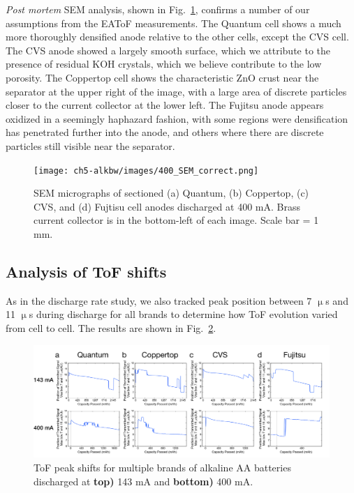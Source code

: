 \textit{Post mortem} SEM analysis, shown in Fig.~\ref{fig:400sem}, confirms a number of our assumptions from the EAToF measurements. The Quantum cell shows a much more thoroughly densified anode relative to the other cells, except the CVS cell. The CVS anode showed a largely smooth surface, which we attribute to the presence of residual KOH crystals, which we believe contribute to the low porosity. The Coppertop cell shows the characteristic ZnO crust near the separator at the upper right of the image, with a large area of discrete particles closer to the current collector at the lower left. The Fujitsu anode appears oxidized in a seemingly haphazard fashion, with some regions were densification has penetrated further into the anode, and others where there are discrete particles still visible near the separator.

\begin{figure}[htb]
  \centering
    \texttt{[image: ch5-alkbw/images/400\_SEM\_correct.png]}
    \caption[SEM micrographs of multiple brands of alkaline AA anodes after discharge at 143 mA.]{SEM micrographs of sectioned (a) Quantum, (b) Coppertop, (c) CVS, and (d) Fujtisu cell anodes discharged at 400 mA. Brass current collector is in the bottom-left of each image. Scale bar = 1 mm.}
    \label{fig:400sem}
\end{figure}

\subsection{Analysis of ToF shifts}

As in the discharge rate study, we also tracked peak position between 7 $\upmu$s and 11 $\upmu$s during discharge for all brands to determine how ToF evolution varied from cell to cell. The results are shown in Fig.~\ref{fig:brandpeak}.

\begin{figure}[htb]
  \centering
    \includegraphics[width=\textwidth]{ch5-alkbw/images/BrandCompEAToF_PeakPos.png}
    \caption[ToF peak shifts for multiple brands of alkaline AA batteries.]{ToF peak shifts for multiple brands of alkaline AA batteries discharged at \textbf{top)} 143 mA and \textbf{bottom)} 400 mA.}
    \label{fig:brandpeak}
\end{figure}

